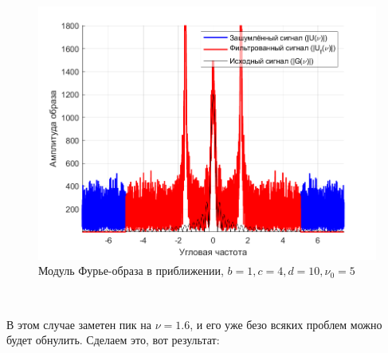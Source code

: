 \documentclass[a4paper]{article}
\begin{document}
\begin{figure}[H]
    \centering
    \includegraphics[width=0.5\linewidth]{part2/1_4_10_Fourier_scaled.png}
    \caption{Модуль Фурье-образа в приближении, $b = 1, c = 4, d = 10, \nu_0 = 5$}
\end{figure}\

В этом случае заметен пик на $\nu = 1.6$, и его уже безо всяких проблем можно будет обнулить. Сделаем это, вот результат:
\end{document}
